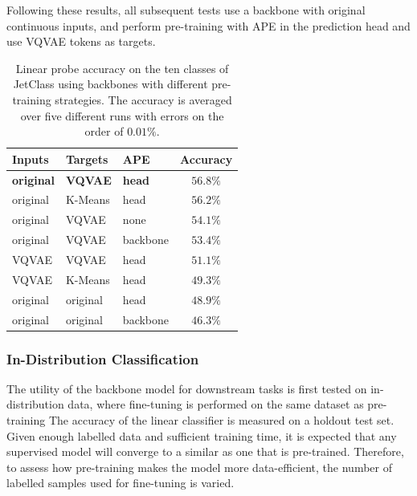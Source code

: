 Following these results, all subsequent tests use a backbone with original continuous inputs, and perform pre-training with APE in the prediction head and use VQVAE tokens as targets.

\begin{table}[htp!]
    \centering
    \caption{Linear probe accuracy on the ten classes of JetClass using backbones with different pre-training strategies. The accuracy is averaged over five different runs with errors on the order of $0.01\%$.
    }
    \label{tab:pretraining_compare}
    \begin{tabular}{lllc}
        \toprule
        Inputs            & Targets        & APE           & Accuracy          \\
        \midrule
        \textbf{original} & \textbf{VQVAE} & \textbf{head} & $\mathbf{56.8\%}$ \\
        original          & K-Means        & head          & $56.2\%$          \\
        original          & VQVAE          & none          & $54.1\%$          \\
        original          & VQVAE          & backbone      & $53.4\%$          \\
        VQVAE             & VQVAE          & head          & $51.1\%$          \\
        VQVAE             & K-Means        & head          & $49.3\%$          \\
        original          & original       & head          & $48.9\%$          \\
        original          & original       & backbone      & $46.3\%$          \\
        \bottomrule
    \end{tabular}
\end{table}

\subsubsection{In-Distribution Classification}

The utility of the backbone model for downstream tasks is first tested on in-distribution data, where fine-tuning is performed on the same dataset as pre-training
The accuracy of the linear classifier is measured on a holdout test set.
Given enough labelled data and sufficient training time, it is expected that any supervised model will converge to a similar as one that is pre-trained.
Therefore, to assess how pre-training makes the model more data-efficient, the number of labelled samples used for fine-tuning is varied.

